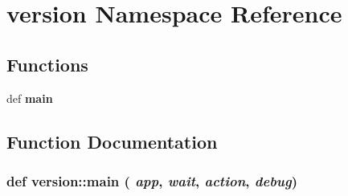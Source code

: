 \section{version Namespace Reference}
\label{namespaceversion}


\subsection*{Functions}
\begin{CompactItemize}
\item 
def {\bf main}
\end{CompactItemize}


\subsection{Function Documentation}
\subsubsection{\setlength{\rightskip}{0pt plus 5cm}def version::main ( {\em app},  {\em wait},  {\em action},  {\em debug})}\label{namespaceversion_b8531238baa84b3cd23095256f8f20c4}


